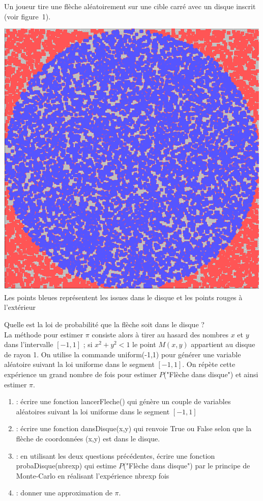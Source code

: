\documentclass{book}
\begin{document}
\begin{Exercice}[Estimer $\pi$]
Un joueur tire une flèche aléatoirement sur une cible carré avec un disque inscrit (voir figure~1). 
\begin{center}
\includegraphics[scale=0.25]{monteCarlo.png}\\
Les points bleues représentent les issues dans le disque et les points rouges à l'extérieur
\end{center}
Quelle est la loi de probabilité que la flèche soit dans le disque ?\\
La méthode pour estimer $\pi$ consiste alors à tirer au hasard des nombres $x$ et $y$ dans l'intervalle $[-1,1]$ ; 
si $x^2 + y^2 < 1$ le point $M(x,y)$ appartient au disque de rayon 1. On utilise la commande uniform(-1,1) pour générer une variable aléatoire suivant la loi uniforme dans le segment $[-1,1]$. On répète cette expérience un grand nombre de fois pour estimer $P$("Flèche dans disque") et ainsi estimer $\pi$. 
\begin{enumerate}
\item {} : écrire une fonction lancerFleche() qui génère un couple de variables aléatoires suivant la loi uniforme dans le segment $[-1,1]$  
\item {} : écrire une fonction dansDisque(x,y)
qui renvoie True ou False selon que la flèche de coordonnées (x,y) est dans le disque.
\item  {} : en utilisant les deux questions précédentes, écrire une fonction probaDisque(nbrexp)
qui estime $P$("Flèche dans disque") par le principe de Monte-Carlo en réalisant l'expérience nbrexp fois
\item {} : donner une approximation de $\pi$.
\end{enumerate}
\end{Exercice}
\end{document}
